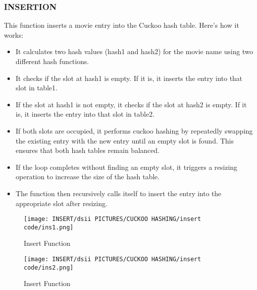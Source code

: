 \documentclass[12pt]{article}
\begin{document}
    \subsubsection{INSERTION}

This function inserts a movie entry into the Cuckoo hash table. Here's how it works:
\begin{itemize}
    \item It calculates two hash values (hash1 and hash2) for the movie name using two different hash functions.
    \item It checks if the slot at hash1 is empty. If it is, it inserts the entry into that slot in table1.
    \item If the slot at hash1 is not empty, it checks if the slot at hash2 is empty. If it is, it inserts the entry into that slot in table2.
    \item If both slots are occupied, it performs cuckoo hashing by repeatedly swapping the existing entry with the new entry until an empty slot is found. This ensures that both hash tables remain balanced.
    \item If the loop completes without finding an empty slot, it triggers a resizing operation to increase the size of the hash table.
    \item The function then recursively calls itself to insert the entry into the appropriate slot after resizing.
\end{itemize}


\begin{figure}[htbp]
    \centering
    \texttt{[image: INSERT/dsii PICTURES/CUCKOO HASHING/insert code/ins1.png]}
    \caption{Insert Function}
    \label{fig:insertion_step1}
\end{figure}

\begin{figure}[htbp]
    \centering
    \texttt{[image: INSERT/dsii PICTURES/CUCKOO HASHING/insert code/ins2.png]}
    \caption{Insert Function}
    \label{fig:insertion_step1}
\end{figure}
\newpage
\end{document}
